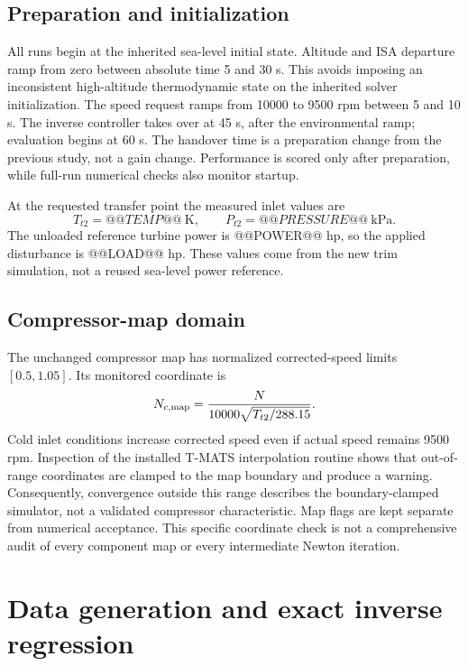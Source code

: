 \subsection{Preparation and initialization}
All runs begin at the inherited sea-level initial state. Altitude and ISA departure ramp from zero between absolute time 5 and 30 s. This avoids imposing an inconsistent high-altitude thermodynamic state on the inherited solver initialization. The speed request ramps from 10000 to 9500 rpm between 5 and 10 s. The inverse controller takes over at 45 s, after the environmental ramp; evaluation begins at 60 s. The handover time is a preparation change from the previous study, not a gain change. Performance is scored only after preparation, while full-run numerical checks also monitor startup.

At the requested transfer point the measured inlet values are
\begin{equation}
T_{t2}=@@TEMP@@\ \mathrm K,\qquad P_{t2}=@@PRESSURE@@\ \mathrm{kPa}.
\end{equation}
The unloaded reference turbine power is @@POWER@@ hp, so the applied disturbance is @@LOAD@@ hp. These values come from the new trim simulation, not a reused sea-level power reference.

\subsection{Compressor-map domain}
The unchanged compressor map has normalized corrected-speed limits $[0.5,1.05]$. Its monitored coordinate is
\begin{equation}
N_{c,\rm map}=\frac{N}{10000\sqrt{T_{t2}/288.15}}.
\end{equation}
Cold inlet conditions increase corrected speed even if actual speed remains 9500 rpm. Inspection of the installed T-MATS interpolation routine shows that out-of-range coordinates are clamped to the map boundary and produce a warning. Consequently, convergence outside this range describes the boundary-clamped simulator, not a validated compressor characteristic. Map flags are kept separate from numerical acceptance. This specific coordinate check is not a comprehensive audit of every component map or every intermediate Newton iteration.

\clearpage
\section{Data generation and exact inverse regression}
